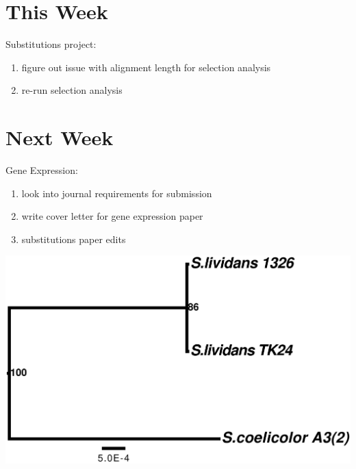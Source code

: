 \documentclass[12pt]{article}
\begin{document}

\section*{This Week}
%
Substitutions project:
\begin{enumerate}
	\item figure out issue with alignment length for selection analysis
	\item re-run selection analysis
\end{enumerate}


\section*{Next Week}
Gene Expression:
\begin{enumerate}
	\item  look into journal requirements for submission
	\item write cover letter for gene expression paper
	\item substitutions paper edits
\end{enumerate}

\newpage

\includegraphics[width=\textwidth]{strep_figtree_fig_28Oct19.pdf}
\end{document}

